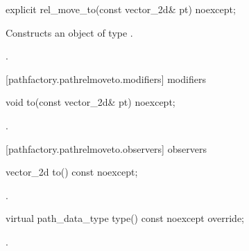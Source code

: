 \begin{itemdecl}
    explicit rel_move_to(const vector_2d& pt) noexcept;
\end{itemdecl}
\begin{itemdescr}
	\pnum
	\effects
	Constructs an object of type .
	
	\pnum
	\postconditions
	.
\end{itemdescr}

 [pathfactory.pathrelmoveto.modifiers]{ modifiers}

\begin{itemdecl}
    void to(const vector_2d& pt) noexcept;
\end{itemdecl}
\begin{itemdescr}
	\pnum
	\postconditions
	.
\end{itemdescr}

 [pathfactory.pathrelmoveto.observers]{ observers}

\begin{itemdecl}
    vector_2d to() const noexcept;
\end{itemdecl}
\begin{itemdescr}
	\pnum
	\returns
	.
\end{itemdescr}

\begin{itemdecl}
    virtual path_data_type type() const noexcept override;
\end{itemdecl}
\begin{itemdescr}
	\pnum
	\returns
	.
\end{itemdescr}
